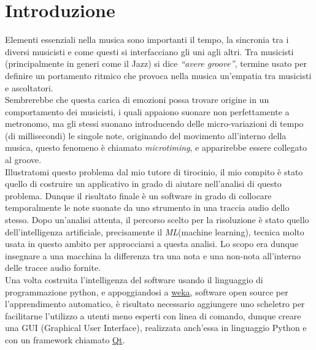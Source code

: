 \chapter*{Introduzione}
\label{cap:introduzione}
\rhead{\thepage}

\pagestyle{plain}
\fancyhf{}
\renewcommand{\headrulewidth}{2pt}
\fancyhead[EL]{\textbf{\textsf{\nouppercase\thepage}}}
\fancyhead[ER]{\textbf{\textsf{\nouppercase\leftmark}}}
\fancyhead[OR]{\textbf{\textsf{\nouppercase\thepage}}}
\fancyhead[OL]{\textbf{\textsf{\nouppercase {\rightmark}}}}

\thispagestyle{empty}

Elementi essenziali nella musica sono importanti il tempo, la sincronia tra i diversi musicisti e come questi si interfacciano gli uni agli altri. Tra musicisti (principalmente in generi come il Jazz) si dice \emph{``avere groove''}, termine usato per definire un portamento ritmico che provoca nella musica un'empatia tra musicisti e ascoltatori\nocite{wiki:groove}.\\
Sembrerebbe che questa carica di emozioni possa trovare origine in un comportamento dei musicisti, i quali appaiono suonare non perfettamente a metronomo, ma gli stessi suonano introducendo delle micro-variazioni di tempo (di millisecondi) le singole note, originando del movimento all'interno della musica, questo fenomeno è chiamato \emph{microtiming}, e apparirebbe essere collegato al groove\nocite{8350302}.\\
Illustratomi questo problema dal mio tutore di tirocinio, il mio compito è stato quello di costruire un applicativo in grado di aiutare nell'analisi di questo problema. Dunque il risultato finale è un software in grado di collocare temporalmente le note suonate da uno strumento in una traccia audio dello stesso. Dopo un'analisi attenta, il percorso scelto per la risoluzione è stato quello dell'intelligenza artificiale, precisamente il \emph{ML}(machine learning), tecnica molto usata in questo ambito \nocite{Wright06towardsmachine}per approcciarsi a questa analisi. Lo scopo era dunque insegnare a una macchina la differenza tra una nota e una non-nota all'interno delle tracce audio fornite.\\
Una volta costruita l'intelligenza del software usando il linguaggio di programmazione python, e appoggiandosi a \href{https://www.cs.waikato.ac.nz/ml/weka/}{weka}, software open source per l'apprendimento automatico, è risultato necessario aggiungere uno scheletro per facilitarne l'utilizzo a utenti meno esperti con linea di comando, dunque creare una GUI (Graphical User Interface), realizzata anch'essa in linguaggio Python e con un framework chiamato \href{https://www.qt.io/}{Qt}.
